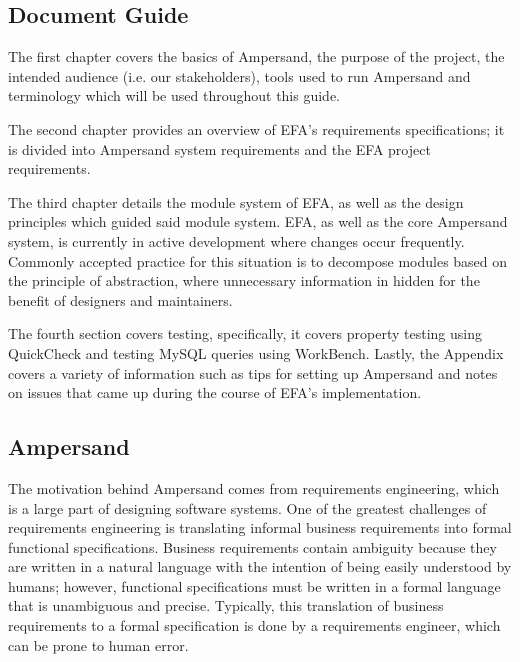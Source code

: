 \documentclass[journal,12pt,onecolumn,draftclsnofoot]{article}
\let\Oldsubsection\subsection
\renewcommand{\subsection}{\FloatBarrier\Oldsubsection}
\begin{document}
\subsection{Document Guide}

The first chapter covers 
the basics of Ampersand, the purpose of the project, the intended audience 
(i.e. our stakeholders), tools used to run Ampersand and terminology which will 
be used throughout this guide. 

The second chapter provides an overview of EFA's requirements specifications; 
it is divided into Ampersand system requirements and the EFA project 
requirements.

The third chapter details the module system of EFA, as well as the design principles
which guided said module system. EFA, as well as the core Ampersand system, is
currently in active development where changes occur frequently. Commonly
accepted practice for this situation is to decompose modules based on the
principle of abstraction, where unnecessary information in hidden for the
benefit of designers and maintainers\citep{modStruct,Parnas1972}.

The fourth section covers testing, specifically, it covers property testing 
using QuickCheck and testing MySQL queries using WorkBench.
Lastly, the Appendix 
covers a variety of information such as tips for setting up 
Ampersand and notes on issues that came up during the course of EFA's 
implementation. 

\subsection{Ampersand}


\indent
The motivation behind Ampersand comes from requirements engineering, which is a 
large part of designing software systems. One of the greatest challenges of 
requirements engineering is translating informal business requirements into 
formal functional specifications. Business requirements contain ambiguity 
because they are written in a natural language with the intention of being 
easily understood by humans; however,
functional specifications must be written in a formal language that is 
unambiguous and precise. Typically, this translation of business requirements 
to a formal specification is done by a requirements
engineer, which can be prone to human error.
\end{document}
